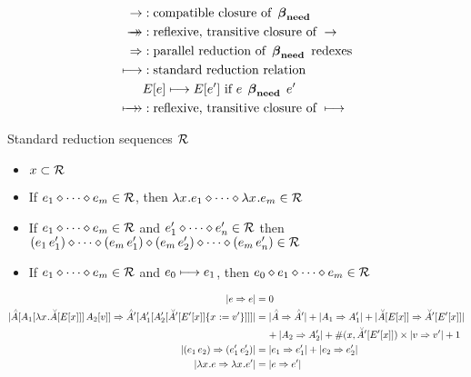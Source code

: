 \documentclass{article}
\begin{document}

%
\begin{align*}
\step&: \textrm{compatible closure of } \betaneednr \\
\steps&: \textrm{reflexive, transitive closure of } \step \\
\pstep&: \textrm{parallel reduction of } \betaneednr \textrm{ redexes} \\
\srstep &: \textrm{standard reduction relation} \\
&\inE{\e} \srstep \inE{\e'} \textrm{ if } \e \;\betaneednr\; \e' \\
\srsteps &: \textrm{reflexive, transitive closure of } \srstep
\end{align*}





\pagebreak



%
%
\begin{definition}[$\srseqop$]
Standard reduction sequences $\srseqset$
\begin{itemize}
\item $x \subset \srseqset$
\item If $\srseqe{m}$, then $\srseq{\lxe_1}{\lxe_m}$
\item If $\srseqe{m}$ and $\srseqe[']{n}$
      then $\srseqappend{(\ap{\e_1}{\e_1'})}{(\ap{\e_m}{\e_1'})}
            \srseq{(\ap{\e_m}{\e_2'})}{(\ap{\e_m}{\e_n'})}$
\item If $\srseqe{m}$ and $\e_0 \srstep \e_1$, then $\e_0 \srseqop \srseqe{m}$
\end{itemize}
\end{definition}


%
%
\begin{definition}
\begin{align*}
  \size{\e \pstep \e} &= 0 \\
  \size{ \inAp{\ap{\inA[_1]{\lx\inAm{\Ex}}}{\Av[_2]}} 
           \pstep
         \inAp[']{\inA[_1']{\inA[_2']{\substx{\inAm[']{\Ex[']}}{\val'}}}} }
    &= \size{\Ap \pstep \Ap'} + \size{\A_1 \pstep \A_1'} +
       \size{\inAm{\Ex} \pstep \inAm[']{\Ex[']}} \\
    &\hspace{4mm} + \size{\A_2 \pstep A_2'} + 
     \numfv{x}{\inAm[']{\Ex[']}} \times \size{\val \pstep \val'} + 1 \\
  \size{\apppp{e_1}{e_2} \pstep \apppp{\e_1'}{\e_2'}}
    &= \size{\e_1 \pstep \e_1'} + \size{\e_2 \pstep \e_2'} \\
  \size{\lxe \pstep \lxe'} &= \size{\e \pstep \e'}
\end{align*}
\end{definition}
\end{document}
